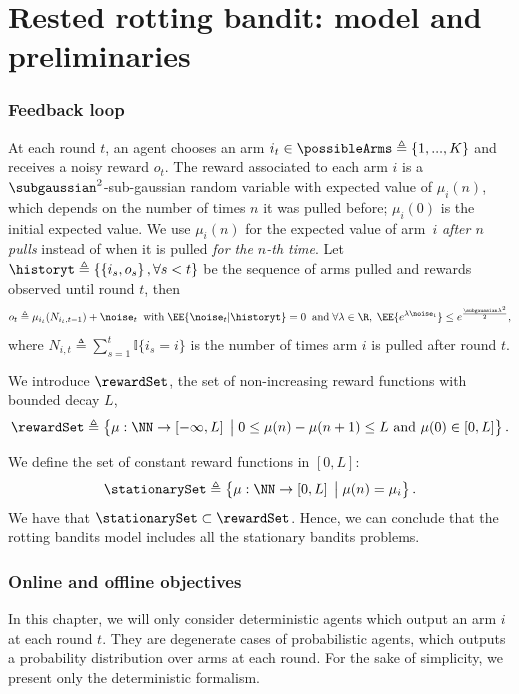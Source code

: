 \section{Rested rotting bandit: model and preliminaries}
\label{sec:rested-model}

\subsubsection*{Feedback loop}
At each round $t$, an agent chooses an arm $i_t \in \possibleArms \triangleq \left\{ 1, ... , K\right\} $ and receives a noisy reward $o_t$. The reward associated to each arm $i$ is a $\subgaussian^2$-sub-gaussian random variable with expected value of $\mu_i(n)$, which depends on the number of times $n$ it was pulled before; $\mu_i(0)$ is the initial expected value.
We use $\mu_i(n)$ for the expected value of arm~$i$ \textit{after $n$ pulls} instead of when it is pulled \textit{for the $n$-th time}. 
Let $\historyt \triangleq \left\{ \left\{ i_s, o_s \right\}, \forall s < t \right\}$ be the sequence of arms pulled and rewards observed until round $t$, then 
%
\begin{equation}
\label{eq:rested-feedback}
o_{t} \triangleq \mu_{i_t}(N_{i_t,t-1}) + \noise_t
 \;\; \text{with}\; \EE{ \noise_t | \historyt }= 0 \;\; \text{and} \; \forall \lambda \in \R, \; \EE{ e^{\lambda\noise_t}} \leq e^{\frac{\subgaussian\lambda^2}{2}},
\end{equation}
%
where $N_{i,t}\triangleq \sum_{s\!=\!1}^{t} \mathbb{I}\{i_s \!=\! i\}$ is the number of times arm $i$ is pulled after round $t$.
\begin{definition}\label{def:rew-bounded-decay} 
We introduce $\rewardSet$, the set of non-increasing reward functions with bounded decay $L$,
\[ 
\rewardSet \triangleq \left\{ \mu : \NN \rightarrow \left[- \infty,  L\right] \;\big{|}\; 0 \leq \mu(n) - \mu(n+1)  \leq L \text{ and } \mu(0) \in \left[0,  L\right] \right\}.
\]
\end{definition}
%
\begin{remark}
We define the set of constant reward functions in $\left[0, L\right]$: 
\[ 
\stationarySet \triangleq \left\{ \mu : \NN \rightarrow \left[0,  L\right] \;\big{|}\;  \mu(n) = \mu_i  \right\}.
\]
We have that $\stationarySet \subset \rewardSet$. Hence, we can conclude that the rotting bandits model includes all the stationary bandits problems.
\end{remark}
%
\subsubsection*{Online and offline objectives}
In this chapter, we will only consider deterministic agents which output an arm $i$ at each round $t$. They are degenerate cases of probabilistic agents, which outputs a probability distribution over arms at each round. For the sake of simplicity, we present only the deterministic formalism.   

